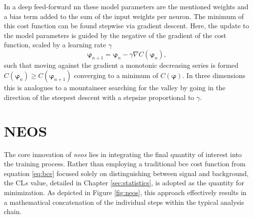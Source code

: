 In a deep feed-forward \ac{nn} these model parameters are the mentioned weights and a bias term added to the sum of the input weights per neuron. The minimum of this cost function can be found stepwise via gradient descent. Here, the update to the model parameters is guided by the negative of the gradient of the cost function, scaled by a learning rate $\gamma$
\begin{equation}
    \bm{\varphi}_{n+1} = \bm{\varphi}_n-\gamma\nabla C(\bm{\varphi}_n),
    \label{eq:grad_descent}
\end{equation}
such that moving against the gradient a monotonic decreasing series is formed $C(\bm{\varphi}_n )\ge C(\bm{\varphi}_{n+1})$ converging to a minimum of $C(\bm{\varphi})$. In three dimensions this is analogues to a mountaineer searching for the valley by going in the direction of the steepest descent with a stepsize proportional to $\gamma$.

\section{NEOS}
The core innovation of \textit{\ac{neos}} lies in integrating the final quantity of interest into the training process. Rather than employing a traditional \ac{bce} cost function from equation \ref{eq:bce} focused solely on distinguishing between signal and background, the $\mathrm{CL}s$ value, detailed in Chapter \ref{sec:statistics}, is adopted as the quantity for minimization. As depicted in Figure \ref{fig:neos}, this approach effectively results in a mathematical concatenation of the individual steps within the typical analysis chain.

